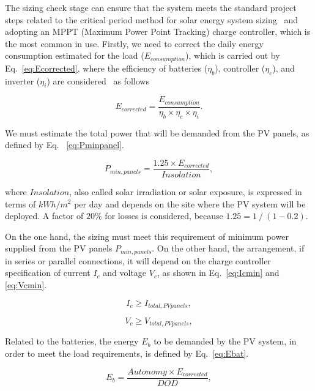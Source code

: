 The sizing check stage can ensure that the system meets the standard project steps related to the critical period method for solar energy system sizing~\cite{Pinho} and adopting an MPPT (Maximum Power Point Tracking) charge controller,
which is the most common in use. Firstly, we need to correct the daily energy consumption estimated for the load 
($E_{consumption}$), which is carried out by Eq.~\eqref{eq:Ecorrected}, where the efficiency of batteries ($\eta_{b}$), 
controller ($\eta_{c}$), and inverter ($\eta_{i}$) are considered~\cite{Pinho} as follows

\begin{equation}
\label{eq:Ecorrected}
E_{corrected} = \dfrac{E_{consumption}}{\eta_{b} \times \eta_{c} \times \eta_{i} }.
\end{equation}

We must estimate the total power that will be demanded from the PV panels, as defined by Eq. ~\eqref{eq:Pminpanel}.

\begin{equation}
\label{eq:Pminpanel}
P_{min,panels} = \dfrac{1.25 \times E_{corrected}}{Insolation},
\end{equation}

\noindent where $Insolation$, also called solar irradiation or solar exposure, is expressed in terms of $kWh/m^{2}$ per day and depends on the site where the PV system will be deployed. A factor of $20$\% for losses is considered, because $1.25 = 1 \mathbin{/} (1 - 0.2)$.

On the one hand, the sizing must meet this requirement of minimum power supplied from the PV panels $P_{min,panels}$. On the other hand, the arrangement, if in series or parallel connections, it will depend on the charge controller specification of current $I_{c}$ and voltage $V_{c}$, as shown in Eq.~\eqref{eq:Icmin} and 
\eqref{eq:Vcmin}.

\begin{equation}
\label{eq:Icmin}
I_{c} \geq I_{total,PVpanels},
\end{equation}

\begin{equation}
\label{eq:Vcmin}
V_{c} \geq V_{total,PVpanels},
\end{equation}

Related to the batteries, the energy $E_{b}$ to be demanded by the PV system, in order to meet the load requirements, is defined by Eq.~\eqref{eq:Ebat}.

\begin{equation}
\label{eq:Ebat}
E_{b} = \dfrac{Autonomy \times E_{corrected}}{DOD},
\end{equation}

